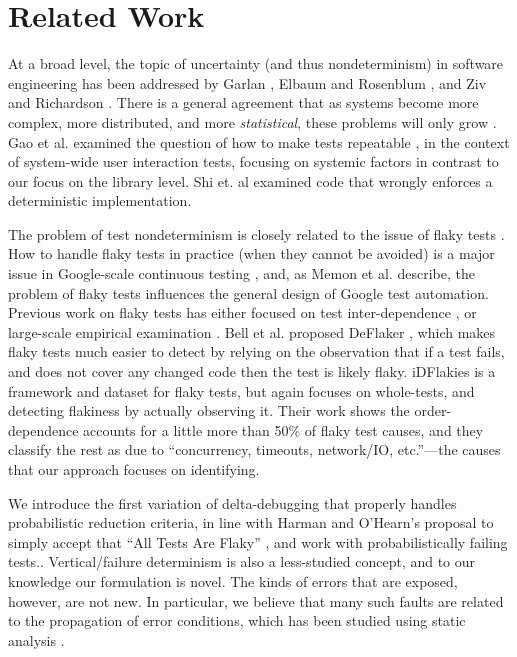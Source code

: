 \section{Related Work}

At a broad level, the topic of uncertainty (and thus nondeterminism) in software engineering has been addressed by Garlan \cite{GarlanUncertain}, Elbaum and Rosenblum \cite{Unknowns,lu2015roundtable}, and Ziv and Richardson \cite{UncertaintyPrinciple}.  There is a general agreement that as systems become more complex, more distributed, and more \emph{statistical}, these problems will only grow \cite{lu2015roundtable}.
Gao et al. examined the question of how to make tests repeatable \cite{Gao:2015:MSU:2818754.2818764}, in the context of system-wide user interaction tests, focusing on systemic factors in contrast to our focus on  the library level.  
Shi et. al \cite{DetermImp} examined code that wrongly enforces a deterministic implementation.  %

The problem of test nondeterminism is closely related to the issue of flaky tests \cite{miccoflaky, luo2014empirical,palomba2017does,listfieldtestanalysis}.  How to handle flaky tests in practice (when they cannot be avoided) is a major issue in Google-scale continuous testing \cite{memon2017taming}, and, as Memon et al. describe, the problem of flaky tests influences the general design of Google test automation.
Previous work on flaky tests has either focused on test inter-dependence \cite{LamZE2015}, or large-scale empirical examination \cite{luo2014empirical,palomba2017does}.  
Bell et al. proposed DeFlaker \cite{bell2018d}, which makes flaky tests much easier to detect by relying on the observation that if a test fails, and does not cover any changed code then the test is likely flaky.   iDFlakies \cite{idflakies} is a framework and dataset for flaky tests, but again focuses on whole-tests, and detecting flakiness by actually observing it.  Their work shows the order-dependence accounts for a little more than 50\% of flaky test causes, and they classify the rest as due to ``concurrency, timeouts,
network/IO, etc.''---the causes that our approach focuses on identifying.

We introduce the first variation of
delta-debugging that properly handles probabilistic reduction criteria, in line with Harman and O'Hearn's proposal to simply accept that ``All Tests Are Flaky'' \cite{StartupstoScaleups}, and work with probabilistically failing tests..
Vertical/failure determinism is also a less-studied concept, and to our knowledge our formulation is novel. The kinds of errors that are exposed, however, are not new.  In particular, we believe that many such faults are related to the propagation of error conditions, which has been studied using static analysis \cite{FileProp}.

